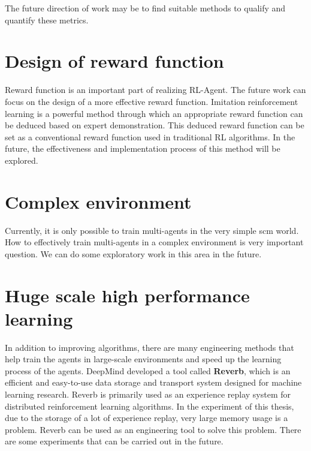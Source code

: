 The future direction of work may be to find suitable methods to qualify and quantify these metrics.

\section{Design of reward function}
Reward function is an important part of realizing RL-Agent. The future work can focus on the design of a more effective reward function. Imitation reinforcement learning is a powerful method through which an appropriate reward function can be deduced based on expert demonstration. This deduced reward function can be set as a conventional reward function used in traditional RL algorithms. In the future, the effectiveness and implementation process of this method will be explored.

\section{Complex environment}
Currently, it is only possible to train multi-agents in the very simple \gls{scm} world. How to effectively train multi-agents in a complex environment is very important question. We can do some exploratory work in this area in the future.

\section{Huge scale high performance learning}
In addition to improving algorithms, there are many engineering methods that help train the agents in large-scale environments and speed up the learning process of the agents. DeepMind developed a tool called \textbf{Reverb}\parencite{cassirer2021reverb}, which is an efficient and easy-to-use data storage and transport system designed for machine learning research. Reverb is primarily used as an experience replay system for distributed reinforcement learning algorithms. In the experiment of this thesis, due to the storage of a lot of experience replay, very large memory usage is a problem. Reverb can be used as an engineering tool to solve this problem. There are some experiments that can be carried out in the future.
